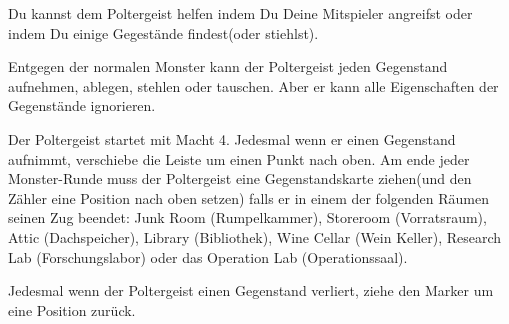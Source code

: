 





Du kannst dem Poltergeist helfen indem Du Deine Mitspieler angreifst oder indem Du einige Gegestände findest(oder stiehlst).


Entgegen der normalen Monster kann der Poltergeist jeden Gegenstand aufnehmen, ablegen, stehlen oder tauschen.
Aber er kann alle Eigenschaften der Gegenstände ignorieren.

  \begin{itemize}
        \bitem Der Poltergeist startet mit Macht 4.
Jedesmal wenn er einen Gegenstand aufnimmt, verschiebe die Leiste um einen Punkt nach oben.
Am ende jeder Monster-Runde muss der Poltergeist eine Gegenstandskarte ziehen(und den Zähler eine Position nach oben setzen) falls er in einem der folgenden Räumen seinen Zug beendet:
Junk Room (Rumpelkammer), Storeroom (Vorratsraum), Attic (Dachspeicher),  Library (Bibliothek),  Wine Cellar (Wein Keller), Research Lab (Forschungslabor) oder das Operation Lab (Operationssaal).

        \bitem Jedesmal wenn der Poltergeist einen Gegenstand verliert, ziehe den Marker um eine Position zurück.

    \end{itemize}

\newpage



